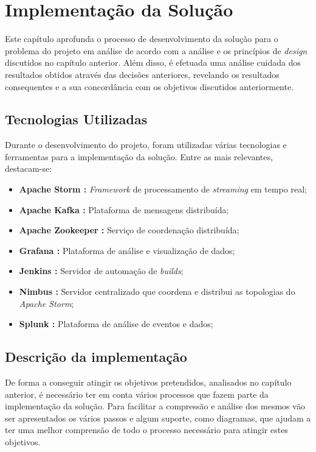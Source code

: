 \chapter{Implementação da Solução}
\label{sec:4-Implementacao}

Este capítulo aprofunda o processo de desenvolvimento da solução para o problema do projeto em 
análise de acordo com a análise e os princípios de \textit{design} discutidos no capítulo anterior. 
Além disso, é efetuada uma análise cuidada dos resultados obtidos através das decisões anteriores, 
revelando os resultados consequentes e a sua concordância com os objetivos discutidos anteriormente.

\section{Tecnologias Utilizadas}

Durante o desenvolvimento do projeto, foram utilizadas várias tecnologias e ferramentas para a 
implementação da solução. Entre as mais relevantes, destacam-se:

\begin{itemize}
  \item \textbf{Apache Storm \cite{storm}:} \textit{Framework} de processamento de 
    \textit{streaming} em tempo real;
  \item \textbf{Apache Kafka \cite{kafka}:} Plataforma de mensagens distribuída;
  \item \textbf{Apache Zookeeper \cite{zookeeper}:} Serviço de coordenação distribuída;
  \item \textbf{Grafana \cite{grafana}:} Plataforma de análise e visualização de dados;
  \item \textbf{Jenkins \cite{jenkins}:} Servidor de automação de \textit{builds}; 
  \item \textbf{Nimbus \cite{nimbus}:} Servidor centralizado que coordena e distribui as topologias 
    do \textit{Apache Storm};
  \item \textbf{Splunk \cite{splunk}:} Plataforma de análise de eventos e dados;
\end{itemize}

\section{Descrição da implementação}

De forma a conseguir atingir os objetivos pretendidos, analisados no capítulo anterior, é
necessário ter em conta vários processos que fazem parte da implementação da solução. Para 
facilitar a compressão e análise dos mesmos vão ser apresentados os vários passos e algum 
suporte, como diagramas, que ajudam a ter uma melhor comprensão de todo o processo necessário
para atingir estes objetivos.

